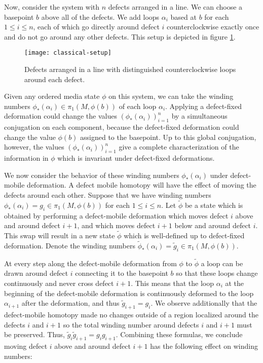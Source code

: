 Now, consider the system with $n$ defects arranged in a line. We can choose a basepoint $b$ above all of the defects. We add loops $\alpha_i$ based at $b$ for each $1\leq i \leq n$, each of which go directly around defect $i$ counterclockwise exactly once and do not go around any other defects. This setup is depicted in figure \ref{fig:classical-setup}.

\begin{figure}
\begin{center}
\texttt{[image: classical-setup]}
\caption{Defects arranged in a line with distinguished counterclockwise loops around each defect.}
\label{fig:classical-setup}
\end{center}
\end{figure}

Given any ordered media state $\phi$ on this system, we can take the winding numbers $\phi_*(\alpha_i)\in \pi_1(M,\phi(b))$ of each loop $\alpha_i$. Applying a defect-fixed deformation could change the values $(\phi_*(\alpha_i))_{i=1}^n$ by a simultaneous conjugation on each component, because the defect-fixed deformation could change the value $\phi(b)$ assigned to the basepoint. Up to this global conjugation, however, the values $(\phi_*(\alpha_i))_{i=1}^n$ give a complete characterization of the information in $\phi$ which is invariant under defect-fixed deformations.

We now consider the behavior of these winding numbers $\phi_*(\alpha_i)$ under defect-mobile deformation. A defect mobile homotopy will have the effect of moving the defects around each other. Suppose that we have winding numbers $\phi_*(\alpha_i)=g_i\in \pi_1(M,\phi(b))$ for each $1\leq i\leq n$. Let $\tilde{\phi}$ be a state which is obtained by performing a defect-mobile deformation which moves defect $i$ above and around defect $i+1$, and which moves defect $i+1$ below and around defect $i$. This swap will result in a new state $\tilde{\phi}$ which is well-defined up to defect-fixed deformation. Denote the winding numbers $\tilde{\phi}_*(\alpha_i)=\tilde{g}_i\in \pi_1(M,\phi(b))$.

At every step along the defect-mobile deformation from $\phi$ to $\tilde{\phi}$ a loop can be drawn around defect $i$ connecting it to the basepoint $b$ so that these loops change continuously and never cross defect $i+1$. This means that the loop $\alpha_i$ at the beginning of the defect-mobile deformation is continuously deformed to the loop $\alpha_{i+1}$ after the deformation, and thus $\tilde{g}_{i+1}=g_i$. We observe additionally that the defect-mobile homotopy made no changes outside of a region localized around the defects $i$ and $i+1$ so the total winding number around defects $i$ and $i+1$ must be preserved. Thus, $\tilde{g}_i\tilde{g}_{i+1}=g_ig_{i+1}$. Combining these formulas, we conclude moving defect $i$ above and around defect $i+1$ has the following effect on winding numbers:

